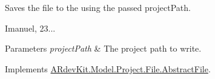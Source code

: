 Saves the file to the using the passed project\-Path. 

Imanuel, 23... 


\begin{DoxyParams}{Parameters}
{\em project\-Path} & The project path to write. \\
\hline
\end{DoxyParams}


Implements \hyperlink{class_a_rdev_kit_1_1_model_1_1_project_1_1_file_1_1_abstract_file_ae49c3262c59642e8f519d0655bbbbbab}{A\-Rdev\-Kit.\-Model.\-Project.\-File.\-Abstract\-File}.

